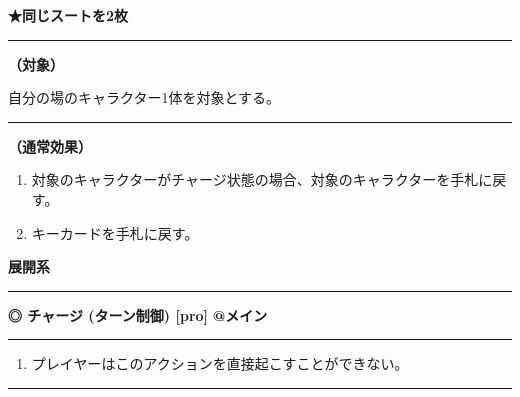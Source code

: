 \documentclass[twocolumn,a5paper,papersize,10pt]{jarticle}
\begin{document}
{\footnotesize\bf ★同じスートを2枚}

\vspace{1mm}%
\hrule height 0.1mm depth 0mm width 66.5mm %
\vspace{1mm}%
{\bf（対象）}

自分の場のキャラクター1体を対象とする。
\vspace{1mm}%
\hrule height 0.1mm depth 0mm width 66.5mm %
\vspace{1mm}%

{\bf（通常効果）}


\vspace{-1zh}%
\begin{enumerate}
\setlength{\leftskip}{-0.3cm}
\setlength{\parskip}{0pt} %

\item 対象のキャラクターがチャージ状態の場合、対象のキャラクターを手札に戻す。

\item キーカードを手札に戻す。
\vspace{-1zh}%
\end{enumerate}


\begin{tcolorbox}
{\scriptsize\bf 展開系}
\end{tcolorbox}
\vspace{-1zh}%
\vspace{2mm} %
\hrule height 0.5mm depth 0mm width 66.5mm %
\vspace{1mm} %
{\small\bf ◎ チャージ {\scriptsize (ターン制御) [pro]}} %
\hfill 
{\footnotesize\bf @メイン }


\vspace{1mm}%
\hrule height 0.1mm depth 0mm width 66.5mm %
\vspace{1mm}%


\vspace{-1zh}%
\begin{enumerate}
\renewcommand{\labelenumi}{※}
\setlength{\leftskip}{-0.3cm}
\setlength{\itemsep}{0pt} %
\setlength{\parskip}{0pt} %

\item プレイヤーはこのアクションを直接起こすことができない。

\vspace{-3mm}%
\end{enumerate}
\vspace{1mm}%
\hrule height 0.1mm depth 0mm width 66.5mm %
\vspace{1mm}%
\end{document}
